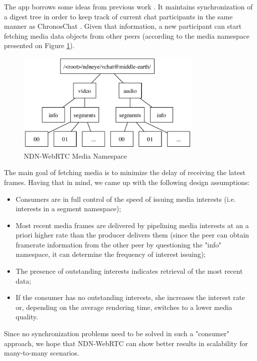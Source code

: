 \documentclass[12pt]{article}
\begin{document}
The app borrows some ideas from previous work \cite{videoTR,ChronosTR}. It maintains synchronization of a digest tree in order to keep track of current chat participants in the same manner as ChronosChat \cite{ChronosTR}. Given that information, a new participant can start fetching media data objects from other peers (according to the media namespace presented on Figure \ref{media-ns}).

\begin{figure}
\centering
\includegraphics[width=0.8\textwidth]{../res/graphics/namespace-v01}
\caption{NDN-WebRTC Media Namespace}
\label{media-ns}
\end{figure}

The main goal of fetching media is to minimize the delay of receiving the latest frames. Having that in mind, we came up with the following design assumptions:

\begin{itemize}
\item Consumers are in full control of the speed of issuing media interests (i.e. interests in a segment namespace);
\item Most recent media frames are delivered by pipelining media interests at an a priori higher rate than the producer delivers them (since the peer can obtain framerate information from the other peer by questioning the "info" namespace, it can determine the frequency of interest issuing);
\item The presence of outstanding interests indicates retrieval of the most recent data;
\item If the consumer has no outstanding interests, she increases the interest rate or, depending on the average rendering time, switches to a lower media quality. 
\end{itemize} 

Since no synchronization problems need to be solved in such a "consumer" approach, we hope that NDN-WebRTC can show better results in scalability for many-to-many scenarios.
\end{document}
